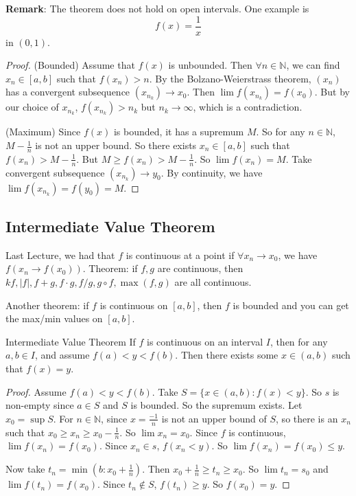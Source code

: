 \documentclass{report}
\begin{document}
\textbf{Remark}: The theorem does not hold on open intervals. One example is 
    \begin{equation*}
        f(x) = \dfrac{1}{x}
    \end{equation*}
in $(0, 1)$.

\begin{proof}
    (Bounded) Assume that $f(x)$ is unbounded. Then $ \forall n \in \mathbb{N}$, we can find $x_{n} \in [a, b]$ such that $f(x_{n}) > n$. By the Bolzano-Weierstrass theorem, $(x_{n})$ has a convergent subsequence $(x_{n_{k}}) \rightarrow x_{0}$. Then $\lim f(x_{n_{k}}) = f(x_{0})$. But by our choice of $x_{n_{k}}$, $f(x_{n_{k}}) > n_{k}$ but $n_{k} \rightarrow \infty$, which is a contradiction.

    (Maximum) Since $f(x)$ is bounded, it has a supremum $M$. So for any $n \in \mathbb{N}$, $M - \frac{1}{n}$ is not an upper bound. So there exists $x_{n} \in [a, b]$ such that $f(x_{n}) > M - \frac{1}{n}$. But $M \geq f(x_{n}) > M - \frac{1}{n}$. So $\lim f(x_{n}) = M$. Take convergent subsequence $(x_{n_{k}}) \rightarrow y_{0}$. By continuity, we have $\lim f(x_{n_{k}}) = f(y_{0}) = M$.
\end{proof}

\begin{topic}
    \section{Intermediate Value Theorem}
\end{topic}

Last Lecture, we had that $f$ is continuous at a  point if $\forall x_{n} \rightarrow x_{0}$, we have $f(x_{n} \rightarrow f(x_{0}))$. Theorem: if $f, g$ are continuous, then $kf, \lvert f \rvert, f + g, f \cdot g, f/g, g \circ f, \max(f, g)$ are all continuous.

Another theorem: if $f$ is continuous on $[a, b]$, then $f$ is bounded and you can get the max/min values on $[a, b]$.

\begin{theorem}{Intermediate Value Theorem}
    If $f$ is continuous on an interval $I$, then for any $a, b \in I$, and assume $f(a) < y < f(b)$. Then there exists some $x \in (a, b)$ such that $f(x) = y$.
\end{theorem}
    \begin{proof}
        Assume $f(a) <  y < f(b)$. Take $S = \{x \in (a, b) : f(x) < y\}$. So $s$ is non-empty since $a \in S$ and $S$ is bounded. So the supremum exists. Let $x_{0} = \sup S$. For $n \in \mathbb{N}$, since $x = \frac{-1}{n}$ is not an upper bound of $S$, so there is an $x_{n}$ such that $x_{0} \geq x_{n} \geq x_{0} - \frac{1}{n}$. So $\lim x_{n} = x_{0}$. Since $f$ is continuous, $\lim f(x_{n}) = f(x_{0})$. Since $x_{n} \in s$, $f(x_{n} < y)$. So $\lim f(x_{n}) = f(x_{0}) \leq y$.

        Now take $t_{n} = \min(b : x_{0} + \frac{1}{n})$. Then $x_{0} + \frac{1}{n} \geq t_{n} \geq x_{0}$. So $\lim t_{n} = s_{0}$ and $\lim f(t_{n}) = f(x_{0})$. Since $t_{n} \notin S$, $f(t_{n}) \geq y$. So $f(x_{0}) = y$.
    \end{proof}
\end{document}
